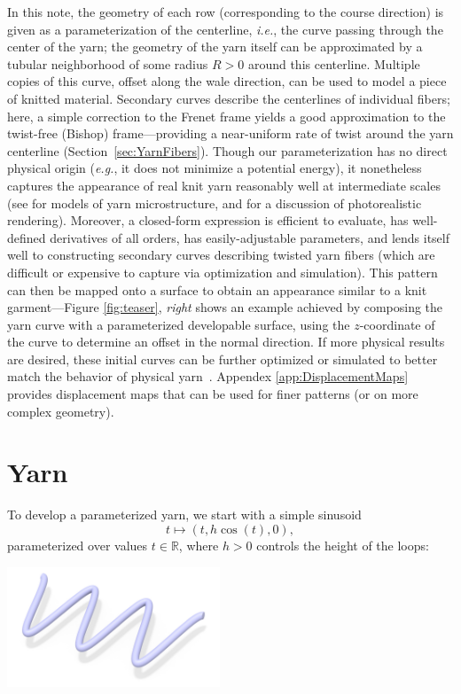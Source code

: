 \documentclass{article}
\newcommand{\ie}{\emph{i.e.}}
\newcommand{\eg}{\emph{e.g.}}
\begin{document}
In this note, the geometry of each row (corresponding to the course direction) is given as a parameterization of the centerline, \ie, the curve passing through the center of the yarn; the geometry of the yarn itself can be approximated by a tubular neighborhood of some radius \(R > 0\) around this centerline.  Multiple copies of this curve, offset along the wale direction, can be used to model a piece of knitted material.  Secondary curves describe the centerlines of individual fibers; here, a simple correction to the Frenet frame yields a good approximation to the twist-free (Bishop) frame---providing a near-uniform rate of twist around the yarn centerline (Section~\ref{sec:YarnFibers}).  Though our parameterization has no direct physical origin (\eg, it does not minimize a potential energy), it nonetheless captures the appearance of real knit yarn reasonably well at intermediate scales (see \citep{zhao2016fitting} for models of yarn microstructure, and \citep{xu2001photorealistic,jakob2010radiative} for a discussion of photorealistic rendering).  Moreover, a closed-form expression is efficient to evaluate, has well-defined derivatives of all orders, has easily-adjustable parameters, and lends itself well to constructing secondary curves describing twisted yarn fibers (which are difficult or expensive to capture via optimization and simulation).  This pattern can then be mapped onto a surface to obtain an appearance similar to a knit garment---Figure \ref{fig:teaser}, \emph{right} shows an example achieved by composing the yarn curve with a parameterized developable surface, using the \(z\)-coordinate of the curve to determine an offset in the normal direction.  If more physical results are desired, these initial curves can be further optimized or simulated to better match the behavior of physical yarn~\citep{kaldor2010efficient,yuksel2012stitch}.  Appendex \ref{app:DisplacementMaps} provides displacement maps that can be used for finer patterns (or on more complex geometry).

\section{Yarn}
\label{sec:Yarn}

To develop a parameterized yarn, we start with a simple sinusoid 
\[
   t \mapsto (t,h\cos(t),0),
\]
parameterized over values \(t \in \mathbb{R}\), where \(h > 0\) controls the height of the loops:

\begin{center}
   \includegraphics[width=2.5in]{images/centerline-cosine.jpg}
\end{center}
\end{document}
